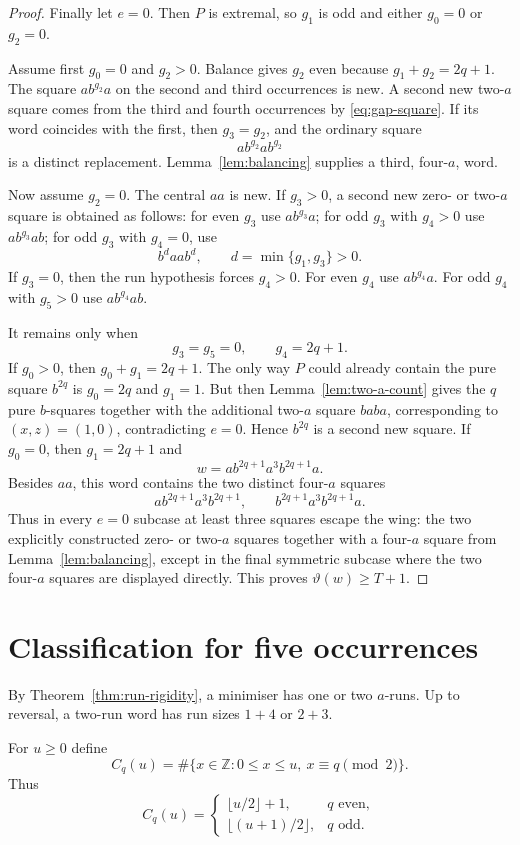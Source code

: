 \documentclass[11pt]{article}
\theoremstyle{definition}
\newcommand{\thetaas}{\vartheta}
\begin{document}
\begin{proof}
Finally let $e=0$. Then $P$ is extremal, so $g_1$ is odd and either $g_0=0$ or $g_2=0$.

Assume first $g_0=0$ and $g_2>0$. Balance gives $g_2$ even because $g_1+g_2=2q+1$. The square $ab^{g_2}a$ on the second and third occurrences is new. A second new two-$a$ square comes from the third and fourth occurrences by \eqref{eq:gap-square}. If its word coincides with the first, then $g_3=g_2$, and the ordinary square
\[
 ab^{g_2}ab^{g_2}
\]
is a distinct replacement. Lemma~\ref{lem:balancing} supplies a third, four-$a$, word.

Now assume $g_2=0$. The central $aa$ is new. If $g_3>0$, a second new zero- or two-$a$ square is obtained as follows: for even $g_3$ use $ab^{g_3}a$; for odd $g_3$ with $g_4>0$ use $ab^{g_3}ab$; for odd $g_3$ with $g_4=0$, use
\[
 b^d aa b^d,\qquad d=\min\{g_1,g_3\}>0.
\]
If $g_3=0$, then the run hypothesis forces $g_4>0$. For even $g_4$ use $ab^{g_4}a$. For odd $g_4$ with $g_5>0$ use $ab^{g_4}ab$.

It remains only when
\[
 g_3=g_5=0,\qquad g_4=2q+1.
\]
If $g_0>0$, then $g_0+g_1=2q+1$. The only way $P$ could already contain the pure square $b^{2q}$ is $g_0=2q$ and $g_1=1$. But then Lemma~\ref{lem:two-a-count} gives the $q$ pure $b$-squares together with the additional two-$a$ square $baba$, corresponding to $(x,z)=(1,0)$, contradicting $e=0$. Hence $b^{2q}$ is a second new square. If $g_0=0$, then $g_1=2q+1$ and
\[
 w=ab^{2q+1}a^3b^{2q+1}a.
\]
Besides $aa$, this word contains the two distinct four-$a$ squares
\[
 ab^{2q+1}a^3b^{2q+1},\qquad
 b^{2q+1}a^3b^{2q+1}a.
\]
Thus in every $e=0$ subcase at least three squares escape the wing: the two explicitly constructed zero- or two-$a$ squares together with a four-$a$ square from Lemma~\ref{lem:balancing}, except in the final symmetric subcase where the two four-$a$ squares are displayed directly. This proves $\thetaas(w)\ge T+1$.
\end{proof}

\section{Classification for five occurrences}

By Theorem~\ref{thm:run-rigidity}, a minimiser has one or two $a$-runs. Up to reversal, a two-run word has run sizes $1+4$ or $2+3$.

For $u\ge0$ define
\[
 C_q(u)=\#\{x\in\mathbb Z:0\le x\le u,\ x\equiv q\pmod2\}.
\]
Thus
\[
 C_q(u)=
 \begin{cases}
 \lfloor u/2\rfloor+1,&q\text{ even},\\
 \lfloor(u+1)/2\rfloor,&q\text{ odd}.
 \end{cases}
\]
\end{document}
